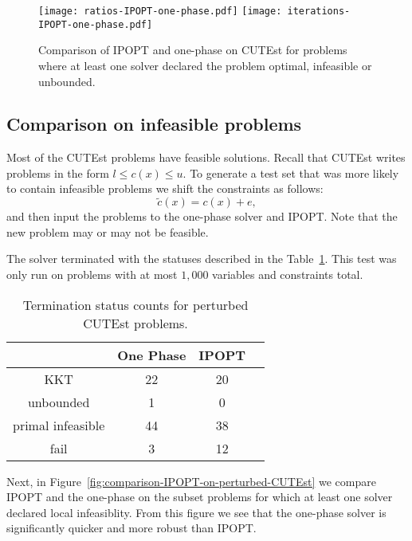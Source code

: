 \documentclass{article}
\begin{document}
\begin{figure}[H]
\texttt{[image: ratios-IPOPT-one-phase.pdf]}
\texttt{[image: iterations-IPOPT-one-phase.pdf]}
\caption{Comparison of IPOPT and one-phase on CUTEst for problems where at least one solver declared the problem optimal, infeasible or unbounded.}\label{fig:comparison-IPOPT-on-CUTEst}
\end{figure}

\if\inProgress
{}
\fi

\subsection{Comparison on infeasible problems}\label{sec:infeas}

Most of the CUTEst problems have feasible solutions. Recall that CUTEst writes problems in the form $l \le c(x) \le u$.
To generate a test set that was more likely to contain infeasible problems we shift the constraints as follows:
$$
\tilde{c}(x) = c(x) + e,
$$
and then input the problems to the one-phase solver and IPOPT. Note that the new problem may or may not be feasible.

The solver terminated with the statuses described in the Table~\ref{tbl:termination-status-counts-peturbed}. This test was only run on problems with at most $1,000$ variables and constraints total.
\begin{table}[H]
\caption{Termination status counts for perturbed CUTEst problems.}\label{tbl:termination-status-counts-peturbed}
\begin{tabular}{ c c c r }
 &  One Phase &  IPOPT &  \\
  \hline
KKT & 22 & 20 \\
unbounded & 1 & 0  \\
primal infeasible & 44 &  38 \\
fail & 3 & 12 \\
\end{tabular}
\end{table}

Next, in Figure~\ref{fig:comparison-IPOPT-on-perturbed-CUTEst} we compare IPOPT and the one-phase on the subset problems for which at least one solver declared local infeasiblity. From this figure we see that the one-phase solver is significantly quicker and more robust than IPOPT.
\end{document}
